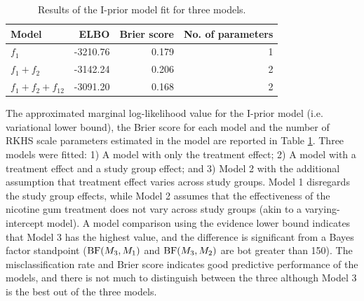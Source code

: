 \documentclass[a4paper,showframe,11pt]{report}\usepackage[]{graphicx}\usepackage[]{color}
\begin{document}
\begin{table}[hbt]
  \centering
  \caption{Results of the I-prior model fit for three models.}
  \label{tab:mod.compare.smoke}
  \begin{tabular}{lrrr}
  \toprule
  Model & ELBO & Brier score & No. of parameters \\
  \midrule
  $f_1$
  &-3210.76
  &0.179 & 1 \\
  $f_1+f_2$
  &-3142.24
  &0.206 & 2 \\
  $f_1+f_2+f_{12}$
  &-3091.20
  &0.168 & 2 \\
  \bottomrule
  \end{tabular}
\end{table}

The approximated marginal log-likelihood value for the I-prior model (i.e. variational lower bound), the Brier score for each model and the number of RKHS scale parameters estimated in the model are reported in Table \ref{tab:mod.compare.smoke}. Three models were fitted:
1) A model with only the treatment effect;
2) A model with a treatment effect and a study group effect; and
3) Model 2 with the additional assumption that treatment effect varies across study groups.
Model 1 disregards the study group effects, while Model 2 assumes that the effectiveness of the nicotine gum treatment does not vary across study groups (akin to a varying-intercept model).
A model comparison using the evidence lower bound indicates that Model 3 has the highest value, and the difference is significant from a Bayes factor standpoint ($\operatorname{BF}(M_3,M_1)$ and $\operatorname{BF}(M_3,M_2)$ are bot greater than 150).
The misclassification rate and Brier score indicates good predictive performance of the models, and there is not much to distinguish between the three although Model 3 is the best out of the three models.
\end{document}
